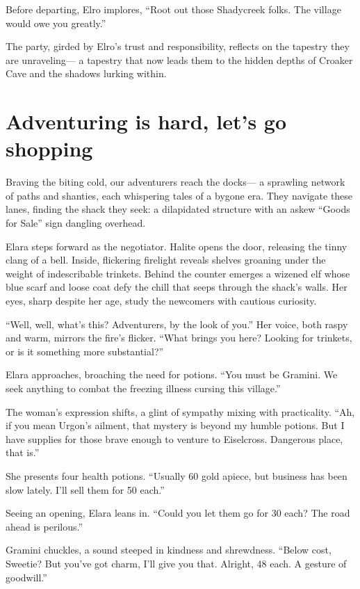 \documentclass[
  letterpaper,12pt,twoside,twocolumn,openany,
  nodeprecatedcode,bg=full]{dndbook}
\begin{document}
Before departing, Elro implores, ``Root out those Shadycreek folks. The
village would owe you greatly.''

The party, girded by Elro's trust and responsibility, reflects on the
tapestry they are unraveling--- a tapestry that now leads them to the
hidden depths of Croaker Cave and the shadows lurking within.

\section{Adventuring is hard, let's go
shopping}\label{adventuring-is-hard-lets-go-shopping}

Braving the biting cold, our adventurers reach the docks--- a sprawling
network of paths and shanties, each whispering tales of a bygone era.
They navigate these lanes, finding the shack they seek: a dilapidated
structure with an askew ``Goods for Sale'' sign dangling overhead.

Elara steps forward as the negotiator. Halite opens the door, releasing
the tinny clang of a bell. Inside, flickering firelight reveals shelves
groaning under the weight of indescribable trinkets. Behind the counter
emerges a wizened elf whose blue scarf and loose coat defy the chill
that seeps through the shack's walls. Her eyes, sharp despite her age,
study the newcomers with cautious curiosity.

``Well, well, what's this? Adventurers, by the look of you.'' Her voice,
both raspy and warm, mirrors the fire's flicker. ``What brings you here?
Looking for trinkets, or is it something more substantial?''

Elara approaches, broaching the need for potions. ``You must be Gramini.
We seek anything to combat the freezing illness cursing this village.''

The woman's expression shifts, a glint of sympathy mixing with
practicality. ``Ah, if you mean Urgon's ailment, that mystery is beyond
my humble potions. But I have supplies for those brave enough to venture
to Eiselcross. Dangerous place, that is.''

She presents four health potions. ``Usually 60 gold apiece, but business
has been slow lately. I'll sell them for 50 each.''

Seeing an opening, Elara leans in. ``Could you let them go for 30 each?
The road ahead is perilous.''

Gramini chuckles, a sound steeped in kindness and shrewdness. ``Below
cost, Sweetie? But you've got charm, I'll give you that. Alright, 48
each. A gesture of goodwill.''
\end{document}
